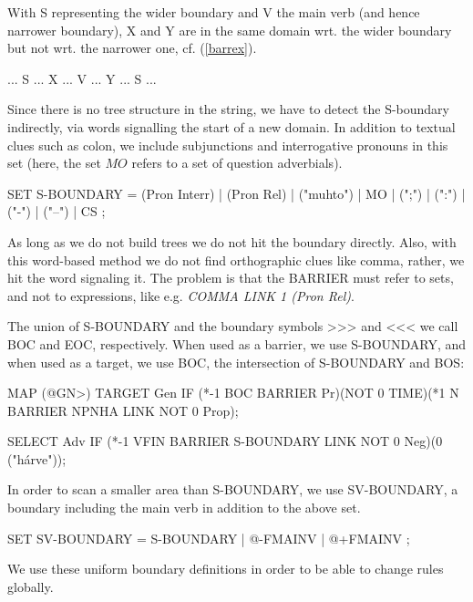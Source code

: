 \documentclass[a4paper,english]{article} %
\begin{document}
With S representing the wider boundary and V the main verb (and hence narrower boundary), X and Y are in the same domain wrt. the wider boundary but not wrt. the narrower one, cf. (\ref{barrex}). %

\begin{example}\label{barrex}
... S ... X ... V ... Y ... S ... 
\end{example}


Since there is no tree structure in the string, we have to detect the S-boundary indirectly, via words signalling the start of a new domain. In addition to textual clues such as colon, we include subjunctions and interrogative pronouns in this set (here, the set $MO$ refers to a set of question adverbials).%

\begin{example}\label{s}
SET S-BOUNDARY  = (Pron Interr) | (Pron Rel) | ("muhto") | MO | (";") | (":") | ("-") | ("–") | CS ;	
\end{example}

As long as we do not build trees we do not hit the boundary directly. Also, with this word-based method we do not find orthographic clues like comma, rather, we hit the word signaling it. The problem is that the BARRIER must refer to sets, and not to expressions, like e.g. \textit{COMMA LINK 1 (Pron Rel)}.%

The union of S-BOUNDARY and the boundary symbols >>> and <<< we call BOC and EOC, respectively. When used as a barrier, we use S-BOUNDARY, and when used as a target, we use BOC, the intersection of S-BOUNDARY and BOS:%

\begin{example}
MAP (@GN>) TARGET Gen IF (*-1 BOC BARRIER Pr)(NOT 0 TIME)(*1 N BARRIER NPNHA LINK NOT 0 Prop);
\end{example}
\begin{example}
SELECT Adv IF (*-1 VFIN BARRIER S-BOUNDARY LINK NOT 0 Neg)(0 ("hárve"));
\end{example}

In order to scan a smaller area than S-BOUNDARY, we use SV-BOUNDARY, a boundary including the main verb in addition to the above set.%

\begin{example}\label{sv}
SET SV-BOUNDARY = S-BOUNDARY | @-FMAINV | @+FMAINV ;
\end{example}

We use these uniform boundary definitions in order to be able to change rules globally.%
\end{document}
